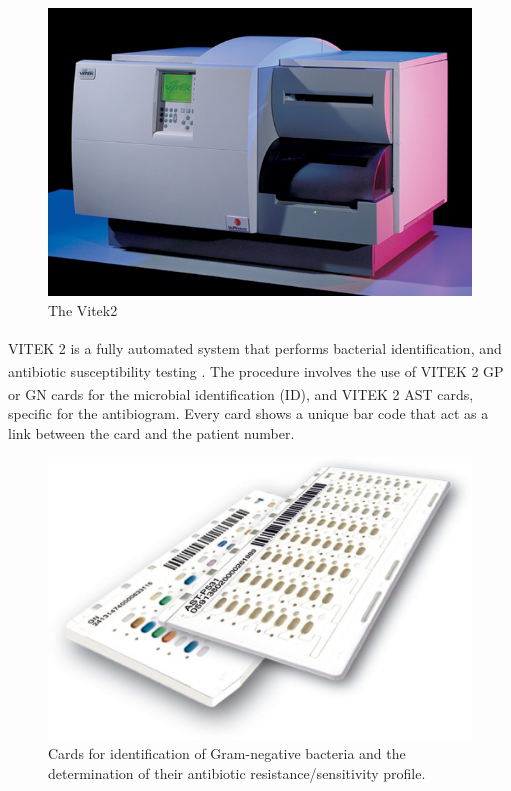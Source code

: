 \documentclass[11pt]{report}
\begin{document}
\begin{figure}[htp]
\centering
\includegraphics[scale=0.500]{img/Vitek_III.jpg}
\caption{The Vitek2}
\label{}
\end{figure}

VITEK\textsuperscript{\textregistered} 2 is a fully automated system that performs bacterial identification, and antibiotic susceptibility testing \cite{Vitek2}.
The procedure involves the use of VITEK\textsuperscript{\textregistered} 2 GP or GN cards for the microbial identification (ID), and VITEK\textsuperscript{\textregistered} 2 AST cards, specific for the antibiogram.
Every card shows a unique bar code that act as a link between the card and the patient number.

\begin{figure}[htp]
\centering
\includegraphics[scale=0.20]{img/Vitek_Cards.jpg}
\caption{Cards for identification of Gram-negative bacteria and the determination of their antibiotic resistance/sensitivity profile.}
\label{}
\end{figure}
\end{document}
